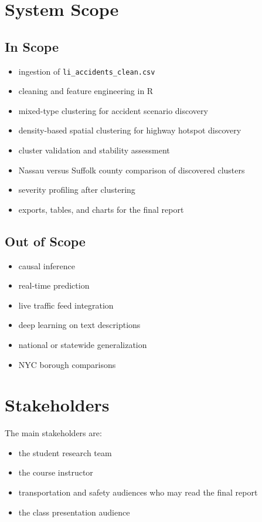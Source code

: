 \documentclass[11pt]{article}
\begin{document}
\section{System Scope}

\subsection{In Scope}

\begin{itemize}
\item ingestion of \texttt{li\_accidents\_clean.csv}
\item cleaning and feature engineering in R
\item mixed-type clustering for accident scenario discovery
\item density-based spatial clustering for highway hotspot discovery
\item cluster validation and stability assessment
\item Nassau versus Suffolk county comparison of discovered clusters
\item severity profiling after clustering
\item exports, tables, and charts for the final report
\end{itemize}

\subsection{Out of Scope}

\begin{itemize}
\item causal inference
\item real-time prediction
\item live traffic feed integration
\item deep learning on text descriptions
\item national or statewide generalization
\item NYC borough comparisons
\end{itemize}

\section{Stakeholders}

The main stakeholders are:

\begin{itemize}
\item the student research team
\item the course instructor
\item transportation and safety audiences who may read the final report
\item the class presentation audience
\end{itemize}
\end{document}
